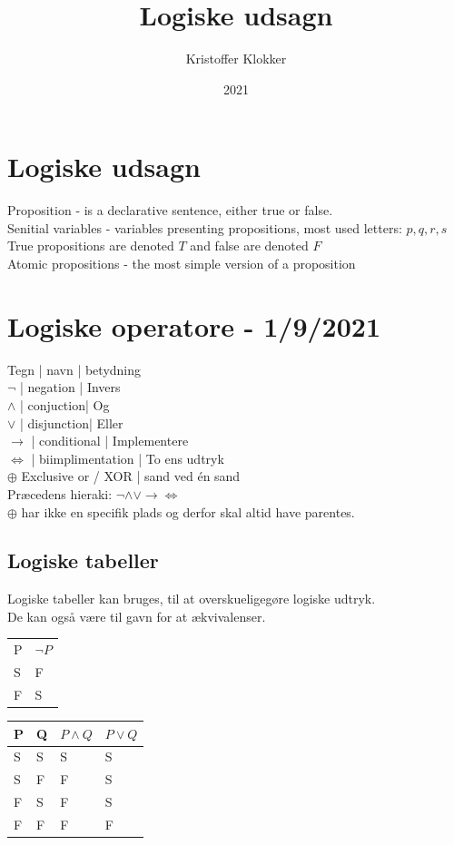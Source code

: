 \documentclass[12pt, a4paper]{article}
\title{Logiske udsagn}
\date{2021}
\author{Kristoffer Klokker}
\begin{document}
	\maketitle
	\clearpage
	\tableofcontents
	\clearpage
		\section{Logiske udsagn}
			Proposition - is a declarative sentence, either true or false.\\
			Senitial variables - variables presenting propositions, most used letters: $p,q,r,s$\\
			True propositions are denoted $T$ and false are denoted $F$\\
			Atomic propositions - the most simple version of a proposition\\

		\section{Logiske operatore - 1/9/2021}
			Tegn | navn | betydning\\
			$\neg$ | negation | Invers\\
			$\land$ | conjuction| Og\\
			$\lor$ | disjunction| Eller\\
			$\rightarrow$ | conditional | Implementere\\
			$\iff$ | biimplimentation | To ens udtryk\\
			$\oplus$ Exclusive or / XOR | sand ved én sand\\
			Præcedens hieraki: $\neg \land \lor \rightarrow \iff$\\
			$\oplus$ har ikke en specifik plads og derfor skal altid have parentes.
			\subsection{Logiske tabeller}
				Logiske tabeller kan bruges, til at overskueligegøre logiske udtryk.\\
				De kan også være til gavn for at ækvivalenser.\\
				\begin{table}[h!]
				\begin{tabular}{|l|l|}
				P & $\neg P$ \\
				S & F\\
				F & S                    
				\end{tabular}
				\end{table}
				\begin{table}[h!]
				\begin{tabular}{|l|l|l|l|}
				\hline
				P & Q & $P\land Q$ & $P \lor Q$ \\ \hline
				S & S & S                       & S                       \\ \hline
				S & F & F                       & S                       \\ \hline
				F & S & F                       & S                       \\ \hline
				F & F & F                       & F                       \\ \hline
				\end{tabular}
				\end{table}
\end{document}
